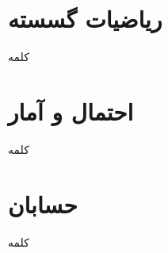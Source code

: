 \section*{ریاضیات گسسته}
کلمه
\dotfill
{}
\\
\section*{احتمال و آمار}
کلمه
\dotfill
{}
\\
\section*{حسابان}
کلمه
\dotfill
{}
\\
